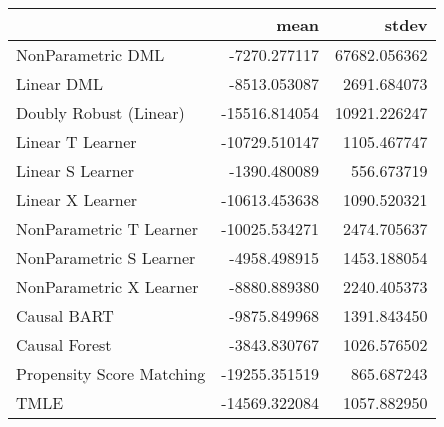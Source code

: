 \begin{tabular}{lrr}
\toprule
{} &          mean &         stdev \\
\midrule
NonParametric DML         &  -7270.277117 &  67682.056362 \\
Linear DML                &  -8513.053087 &   2691.684073 \\
Doubly Robust (Linear)    & -15516.814054 &  10921.226247 \\
Linear T Learner          & -10729.510147 &   1105.467747 \\
Linear S Learner          &  -1390.480089 &    556.673719 \\
Linear X Learner          & -10613.453638 &   1090.520321 \\
NonParametric T Learner   & -10025.534271 &   2474.705637 \\
NonParametric S Learner   &  -4958.498915 &   1453.188054 \\
NonParametric X Learner   &  -8880.889380 &   2240.405373 \\
Causal BART               &  -9875.849968 &   1391.843450 \\
Causal Forest             &  -3843.830767 &   1026.576502 \\
Propensity Score Matching & -19255.351519 &    865.687243 \\
TMLE                      & -14569.322084 &   1057.882950 \\
\bottomrule
\end{tabular}
